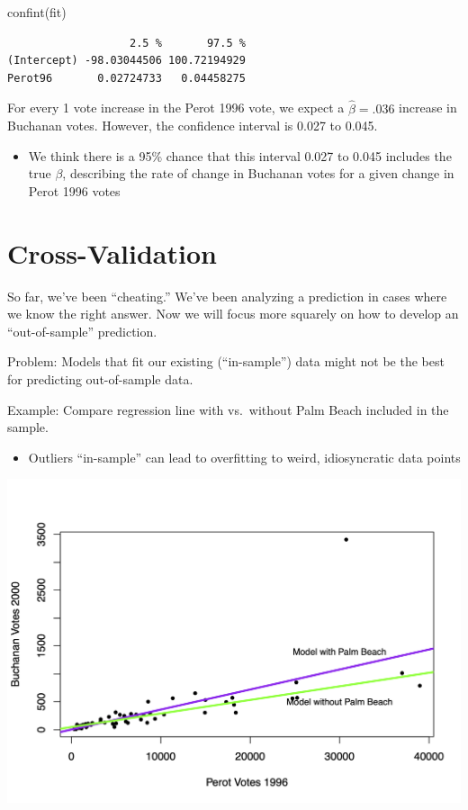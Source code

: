 \documentclass[
  letterpaper,
  DIV=11,
  numbers=noendperiod]{scrreprt}
\newenvironment{Shaded}{\begin{snugshade}}{\end{snugshade}}
\newcommand{\FunctionTok}[1]{\textcolor[rgb]{0.28,0.35,0.67}{#1}}
\newcommand{\NormalTok}[1]{\textcolor[rgb]{0.00,0.23,0.31}{#1}}
\providecommand{\tightlist}{%
  \setlength{\itemsep}{0pt}\setlength{\parskip}{0pt}}\usepackage{longtable,booktabs,array}
\begin{document}
\begin{Shaded}
\begin{Highlighting}[]
\FunctionTok{confint}\NormalTok{(fit)}
\end{Highlighting}
\end{Shaded}

\begin{verbatim}
                   2.5 %       97.5 %
(Intercept) -98.03044506 100.72194929
Perot96       0.02724733   0.04458275
\end{verbatim}

For every 1 vote increase in the Perot 1996 vote, we expect a
\(\hat \beta =.036\) increase in Buchanan votes. However, the confidence
interval is 0.027 to 0.045.

\begin{itemize}
\tightlist
\item
  We think there is a 95\% chance that this interval 0.027 to 0.045
  includes the true \(\beta\), describing the rate of change in Buchanan
  votes for a given change in Perot 1996 votes
\end{itemize}

\hypertarget{cross-validation}{%
\section{Cross-Validation}\label{cross-validation}}

So far, we've been ``cheating.'' We've been analyzing a prediction in
cases where we know the right answer. Now we will focus more squarely on
how to develop an ``out-of-sample'' prediction.

Problem: Models that fit our existing (``in-sample'') data might not be
the best for predicting out-of-sample data.

Example: Compare regression line with vs.~without Palm Beach included in
the sample.

\begin{itemize}
\tightlist
\item
  Outliers ``in-sample'' can lead to overfitting to weird, idiosyncratic
  data points
\end{itemize}

\includegraphics{images/overfit.png}
\end{document}

